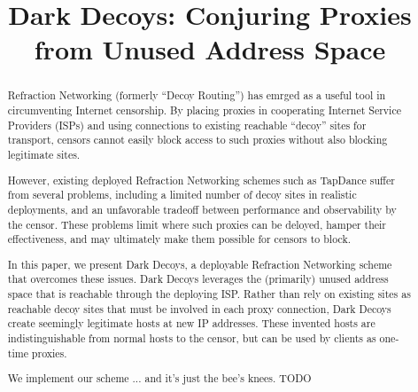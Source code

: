 \documentclass[letterpaper,twocolumn,10pt]{article}
\begin{document}
\date{}

\title{\Large \bf Dark Decoys:
  Conjuring Proxies from Unused Address Space}


\maketitle

\begin{abstract}
Refraction Networking (formerly ``Decoy Routing'') has emrged as a useful tool in circumventing
        Internet censorship. By placing proxies in cooperating Internet Service
        Providers (ISPs) and using connections to existing reachable
        ``decoy'' sites for transport, censors cannot easily block access to
        such proxies without also blocking legitimate sites.

However, existing deployed Refraction Networking schemes such as TapDance suffer
from several problems, including a limited number of decoy sites in realistic
deployments, and an unfavorable tradeoff between performance and observability
by the censor. These problems limit where such proxies can be deloyed, hamper
their effectiveness, and may ultimately make them possible for censors to block.

In this paper, we present Dark Decoys, a deployable Refraction Networking scheme that
overcomes these issues. Dark Decoys leverages the (primarily) unused address
space that is reachable through the deploying ISP. Rather than rely on existing
sites as reachable decoy sites that must be involved in each proxy connection,
Dark Decoys create seemingly legitimate hosts at new IP addresses. These
invented hosts are indistinguishable from normal hosts to the censor, but can
be used by clients as one-time proxies.

We implement our scheme ... and it's just the bee's knees. TODO

\end{abstract}
\end{document}

